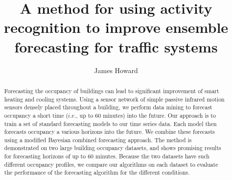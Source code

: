 \documentclass[letterpaper,12pt]{article}
\title{A method for using activity recognition to improve ensemble forecasting for traffic systems}
\author{James Howard}
\begin{document}
\frontmatter

\maketitle
\newpage

\makecopyright{\the\year}
\newpage


\makesubmittal
\newpage

\begin{abstract}
Forecasting the occupancy of buildings can lead to significant improvement of smart heating and cooling systems. Using a sensor network of simple passive infrared motion sensors densely placed throughout a building, we perform data mining to forecast occupancy a short time ($i.e.$, up to 60 minutes) into the future.  Our approach is to train a set of standard forecasting models to our time series data.  Each model then forecasts occupancy a various horizons into the future.  We combine these forecasts using a modified Bayesian combined forecasting approach.  The method is demonstrated on two large building occupancy datasets, and shows promising results for forecasting horizons of up to 60 minutes.  Because the two datasets have such different occupancy profiles, we compare our algorithms on each dataset to evaluate the performance of the forecasting algorithm for the different conditions.
\end{abstract}

\newpage


\tableofcontents
\newpage


\listoffiguresandtables
\newpage


\newpage

\listofabbreviations*
\newpage
\end{document}
